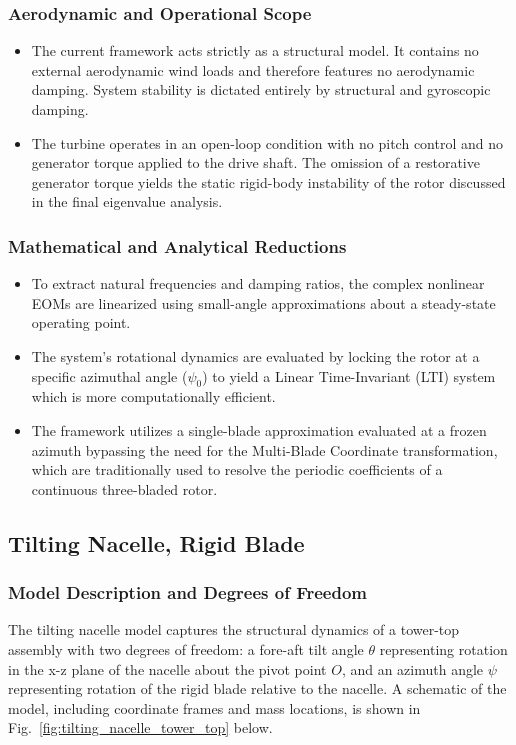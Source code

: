 \documentclass[final,onecolumn]{IEEEtran}
\begin{document}
\subsubsection*{Aerodynamic and Operational Scope}
\begin{itemize}
    \item The current framework acts strictly as a structural model. It contains no external aerodynamic wind loads and therefore features no aerodynamic damping. System stability is dictated entirely by structural and gyroscopic damping.
    \item The turbine operates in an open-loop condition with no pitch control and no generator torque applied to the drive shaft. The omission of a restorative generator torque yields the static rigid-body instability of the rotor discussed in the final eigenvalue analysis.
\end{itemize}

\subsubsection*{Mathematical and Analytical Reductions}
\begin{itemize}
    \item To extract natural frequencies and damping ratios, the complex nonlinear EOMs are linearized using small-angle approximations about a steady-state operating point.
    \item The system's rotational dynamics are evaluated by locking the rotor at a specific azimuthal angle ($\psi_0$) to yield a Linear Time-Invariant (LTI) system which is more computationally efficient.
    \item The framework utilizes a single-blade approximation evaluated at a frozen azimuth bypassing the need for the Multi-Blade Coordinate transformation, which are traditionally used to resolve the periodic coefficients of a continuous three-bladed rotor.
\end{itemize}

\subsection{Tilting Nacelle, Rigid Blade}\label{sec:tilting_nacelle_rigid_blade}
\subsubsection{Model Description and Degrees of Freedom}
The tilting nacelle model captures the structural dynamics of a tower-top assembly with two degrees of freedom: a fore-aft tilt angle $\theta$ representing rotation in the x-z plane of the nacelle about the pivot point $O$, and an azimuth angle $\psi$ representing rotation of the rigid blade relative to the nacelle. A schematic of the model, including coordinate frames and mass locations, is shown in Fig.~\ref{fig:tilting_nacelle_tower_top} below.
\end{document}
